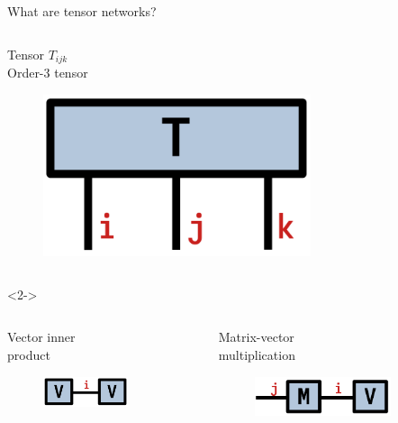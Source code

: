 \begin{frame}[fragile]{What are tensor networks?}
\begin{columns}
  \begin{column}[T]{0.33\textwidth}
    \centering
    Tensor $T_{ijk}$ \\
    Order-3 tensor
    \begin{figure}[T]
      \includegraphics[width=0.7\textwidth]{
        slides/assets/T.png
      }
    \end{figure}
  \end{column}

\end{columns}

\vspace*{0.4cm}

\begin{onlyenv}<2->

\begin{columns}

  \begin{column}[T]{0.33\textwidth}
    \centering
    Vector inner\\
    product
    \begin{figure}[T]
      \includegraphics[width=0.7\textwidth]{
        slides/assets/VV.png
      }
    \end{figure}
  \end{column}

  \begin{column}[T]{0.33\textwidth}
    \centering
    Matrix-vector\\
    multiplication
    \begin{figure}[T]
      \includegraphics[width=0.8\textwidth]{
        slides/assets/MV.png
      }
    \end{figure}
  \end{column}


\end{columns}
\end{onlyenv}
\end{frame}

